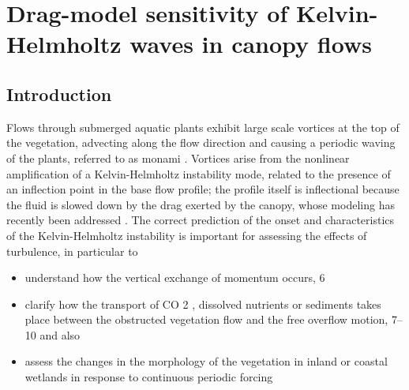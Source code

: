 \chapter{Drag-model sensitivity of Kelvin-Helmholtz waves in canopy flows}
\label{ch:stability}



\section{Introduction}

Flows through submerged aquatic plants exhibit large scale vortices at the top of the vegetation,
advecting along the flow direction and causing a periodic waving of the plants, referred to as
monami \cite{ackerman1993reduced}.  Vortices arise from the nonlinear amplification of a Kelvin-Helmholtz instability mode,
related to the presence of an inflection point in the base flow profile; \cite{asaeda2005morphological} the profile itself is inflectional
because the fluid is slowed down by the drag exerted by the canopy, whose modeling has recently
been addressed \cite{py2004mixing} \cite{singh2016linear}  \cite{zampogna2016instability}. The correct prediction of the onset and characteristics of the Kelvin-Helmholtz
instability is important for assessing the effects of turbulence, in particular to
\begin{itemize}
	\item  understand how the vertical exchange of momentum occurs, 6
	\item clarify how the transport of CO 2 , dissolved nutrients or sediments takes place between the
	obstructed vegetation flow and the free overflow motion, 7–10 and also
	\item assess the changes in the morphology of the vegetation in inland or coastal wetlands in
	response to continuous periodic forcing \cite{asaeda2005morphological} \cite{patil2010characteristics}
\end{itemize}

